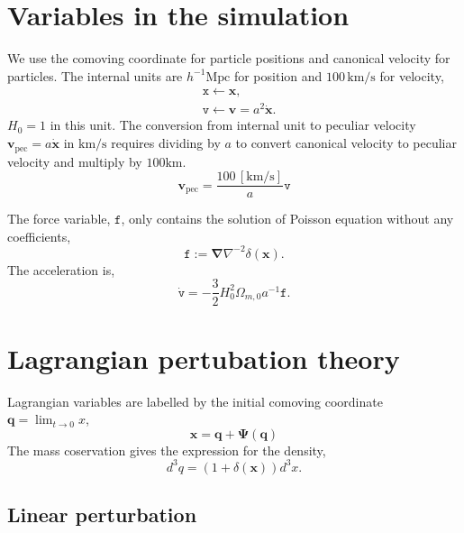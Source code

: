 \documentclass[a4paper]{article}
\begin{document}
\section{Variables in the simulation}
We use the comoving coordinate for particle positions and canonical
velocity for particles. The internal units are $h^{-1}
\mathrm{Mpc}$ for position and $100 \,\mathrm{km/s}$ for velocity, 
\begin{align}
  &\texttt{x} \leftarrow \bm{x},\\
  &\texttt{v} \leftarrow \bm{v} = a^2 \dot{\bm{x}}.
\end{align}
$H_0 = 1$ in this unit.
%
The conversion from internal unit to peculiar velocity
$\bm{v}_\mathrm{pec} = a \dot{\bm{x}}$ in $\mathrm{km}/\mathrm{s}$
requires dividing by $a$ to convert canonical velocity to peculiar
velocity and multiply by $100
\mathrm{km}$.
\begin{equation}
  \bm{v}_\mathrm{pec} = \frac{100 \,\mathrm{[km/s]}}{a} \texttt{v}
\end{equation}

The force variable, $\texttt{f}$, only contains the solution of Poisson
equation without any coefficients,
\begin{equation}
  \texttt{f} := \bm{\nabla} \nabla^{-2} \delta(\bm{x}).
\end{equation}
The acceleration is,
\begin{equation}
  \dot{\texttt{v}} = -\frac{3}{2} H_0^2 \Omega_{m,0} a^{-1} \texttt{f}.
\end{equation}

\section{Lagrangian pertubation theory}
Lagrangian variables are labelled by the initial comoving coordinate $\bm{q} = \lim_{t \rightarrow 0} x$,
\begin{equation}
  \bm{x} = \bm{q} + \bm{\Psi}(\bm{q})
\end{equation}
The mass coservation gives the expression for the density,
\begin{equation}
  d^3 q = (1 + \delta(\bm{x})) d^3 x.
\end{equation}

\subsection{Linear perturbation}
\end{document}
